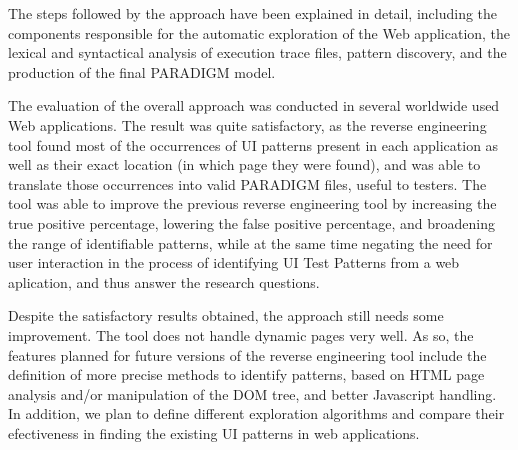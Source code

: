 \documentclass[conference]{IEEEtran}
\begin{document}
The steps followed by the approach have been explained in detail, including the components responsible for the automatic exploration of the Web application, the lexical and syntactical analysis of execution trace files, pattern discovery, and the production of the final PARADIGM model.

The evaluation of the overall approach was conducted in several worldwide used Web applications. The result was quite satisfactory, as the reverse engineering tool found most of the occurrences of UI patterns present in each application as well as their exact location (in which page they were found), and was able to translate those occurrences into valid PARADIGM files, useful to testers. The tool was able to improve the previous reverse engineering tool by increasing the true positive percentage, lowering the false positive percentage, and broadening the range of identifiable patterns, while at the same time negating the need for user interaction in the process of identifying UI Test Patterns from a web aplication, and thus answer the research questions.

Despite the satisfactory results obtained, the approach still needs some improvement. The tool does not handle dynamic pages very well. As so, the features planned for future versions of the reverse engineering tool include the definition of more precise methods to identify patterns, based on HTML page analysis and/or manipulation of the DOM tree, and better Javascript handling. In addition, we plan to define different exploration algorithms and compare their efectiveness in finding the existing UI patterns in web applications. 



\end{document}
